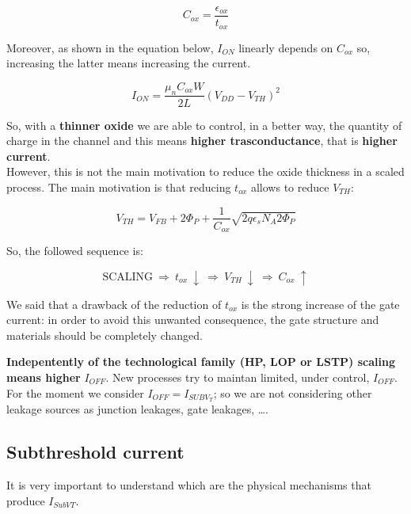 \documentclass[a4paper, 12pt, twoside, openright]{report}
\begin{document}
\begin{equation}
C_{ox} = \frac{\epsilon_{ox}}{t_{ox}}
\label{}
\end{equation}

Moreover, as shown in the equation below, $I_{ON}$ linearly depends on $C_{ox}$ so, increasing the latter means increasing the current.

\begin{equation}
I_{ON} = \frac{\mu_n C_{ox} W}{2 L} (V_{DD} - V_{TH})^2
\label{}
\end{equation}

So, with a \textbf{thinner oxide} we are able to control, in a better way, the quantity of charge in the channel and this means \textbf{higher trasconductance}, that is \textbf{higher current}.\\
However, this is not the main motivation to reduce the oxide thickness in a scaled process. The main motivation is that reducing $t_{ox}$ allows to reduce $V_{TH}$:

\begin{equation}
V_{TH} = V_{FB} + 2 \Phi_{P} + \frac{1}{C_{ox}} \sqrt{2 q \epsilon_s N_A 2 \Phi_{P}}
\label{V_th}
\end{equation}

So, the followed sequence is:

\begin{equation}
\text{SCALING} \ \Rightarrow \ t_{ox} \ \downarrow \ \Rightarrow \ V_{TH} \ \downarrow \ \Rightarrow \ C_{ox} \ \uparrow
\end{equation}

We said that a drawback of the reduction of $t_{ox}$ is the strong increase of the gate current: in order to avoid this unwanted consequence, the gate structure and materials should be completely changed.

\textbf{Indepentently of the technological family (HP, LOP or LSTP) scaling means higher} $I_{OFF}$. New processes try to maintan limited, under control, $I_{OFF}$. For the moment we consider $I_{OFF} = I_{SUBV_{T}}$; so we are not considering other leakage sources as junction leakages, gate leakages, \dots.

\subsection{Subthreshold current}

It is very important to understand which are the physical mechanisms that produce $I_{SubVT}$.
\end{document}

